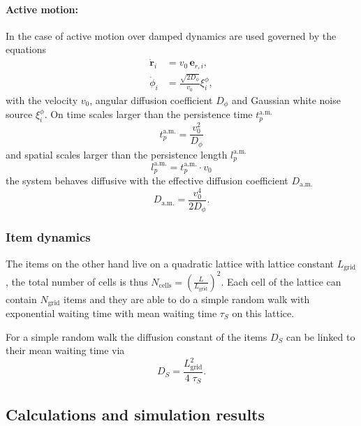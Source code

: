 \paragraph{Active motion:}

In the case of active motion over damped dynamics \cite{Milster} are used governed by the equations
%
\begin{align}
 \nonumber \dot{\mathbf r}_i &= v_0\,\mathbf e_{r,i},\\
 \dot \phi_i &= \frac{\sqrt{2 D_\phi}}{v_0}\xi_i^\phi, 
\label{eq:DGLactm_simset}
\end{align}
%
with the velocity $v_0$, angular diffusion coefficient $D_\phi$ and Gaussian white noise source $\xi_i^\phi$. On time scales larger than the persistence time $t_p^{\text{a.m.}}$
%
\begin{equation}
 t_{p}^{\text{a.m.}}=\frac{v_0^2}{D_\phi} 
\label{eq:perstime_simset} 
\end{equation}
%
and spatial scales larger than the persistence length $l_p^{\text{a.m.}}$
%
\begin{equation}
 l_p^{\text{a.m.}}=t_p^{\text{a.m.}}\cdot v_0
\label{eq:perslength_simset}
\end{equation}
%
the system behaves diffusive with the effective diffusion coefficient $D_{\text{a.m.}}$
%
\begin{equation}
 D_{\text{a.m.}}=\frac{v_0^4}{2 D_\phi}.
\label{eq:Dam_simset}
\end{equation}

\subsubsection{Item dynamics}

The items on the other hand live on a quadratic lattice with lattice constant $L_\text{grid}$, the total number of cells is thus $N_\text{cells}=\left(\frac{L}{L_\text{grid}}\right)^2$. Each cell of the lattice can contain $N_\text{grid}$ items and they are able to do a simple random walk with exponential waiting time with mean waiting time $\tau_S$ on this lattice.

For a simple random walk the diffusion constant of the items $D_S$ can be linked to their mean waiting time via \cite{SokolovKlafter}
%
\begin{equation}
	D_S = \frac{L_\text{grid}^2}{4\;\tau_S}.
\end{equation}


\subsection{Calculations and simulation results}

